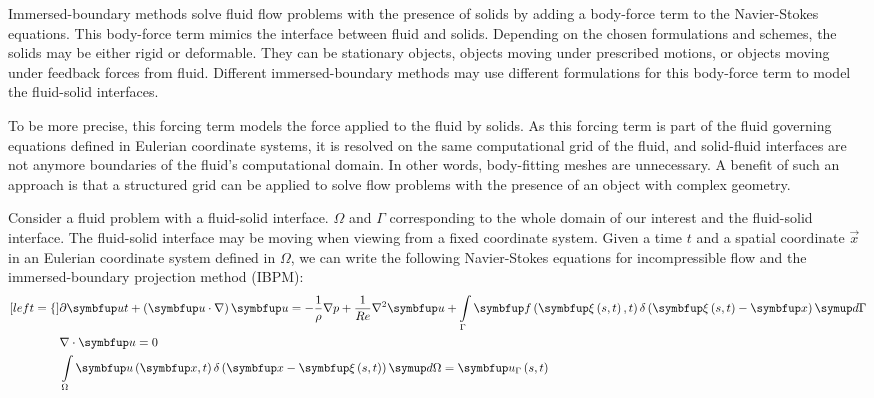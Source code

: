 
Immersed-boundary methods solve fluid flow problems with the presence of solids by adding a body-force term to the Navier-Stokes equations.
This body-force term mimics the interface between fluid and solids.
Depending on the chosen formulations and schemes, the solids may be either rigid or deformable.
They can be stationary objects, objects moving under prescribed motions, or objects moving under feedback forces from fluid.
Different immersed-boundary methods may use different formulations for this body-force term to model the fluid-solid interfaces.

To be more precise, this forcing term models the force applied to the fluid by solids.
As this forcing term is part of the fluid governing equations defined in Eulerian coordinate systems, it is resolved on the same computational grid of the fluid, and solid-fluid interfaces are not anymore boundaries of the fluid's computational domain.
In other words, body-fitting meshes are unnecessary.
A benefit of such an approach is that a structured grid can be applied to solve flow problems with the presence of an object with complex geometry.

Consider a fluid problem with a fluid-solid interface.
$\Omega$ and $\Gamma$ corresponding to the whole domain of our interest and the fluid-solid interface.
The fluid-solid interface may be moving when viewing from a fixed coordinate system.
Given a time $t$ and a spatial coordinate $\vec{x}$ in an Eulerian coordinate system defined in $\Omega$, we can write the following Navier-Stokes equations for incompressible flow and the immersed-boundary projection method (IBPM):
\begin{subequations}\label{eq:mod-ns}
    \begin{align}[left=\empheqlbrace\,]
        &\pdiff{\vec{u}}{t} + \left(\vec{u} \cdot \nabla\right) \vec{u}
            =
            -\frac{1}{\rho}\nabla p + \frac{1}{Re} \nabla^2 \vec{u} + 
            \int\limits_{\Gamma} \vec{f}\left(\vec{\xi}\left(s, t \right), t\right) \delta\left(\vec{\xi}\left(s, t\right)-\vec{x}\right)\diff {\Gamma} 
            \label{eq:mod-ns-momentum} \\
        &\nabla \cdot \vec{u} = 0 \label{eq:mod-ns-cont}\\
        &\int\limits_{\Omega} \vec{u}\left(\vec{x}, t\right) \delta \left(\vec{x}-\vec{\xi}\left(s, t\right)\right)\diff\Omega
            =
            \vec{u}_{\Gamma}\left(s, t\right)
            \label{eq:mod-ns-body-vel}
    \end{align}
\end{subequations}

